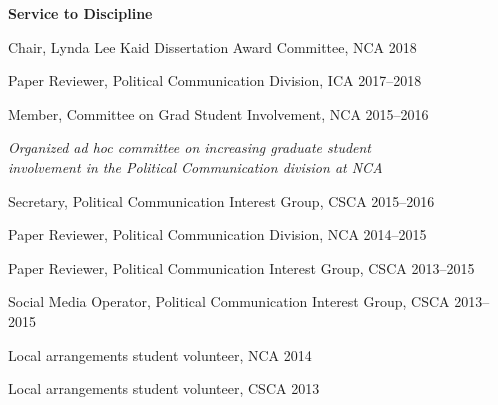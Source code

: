 \textbf{Service to Discipline}
  \begin{innerlist}
    \item Chair, Lynda Lee Kaid Dissertation Award Committee, NCA \hfill 2018
    \item Paper Reviewer, Political Communication Division, ICA \hfill 2017--2018
    \item Member, Committee on Grad Student Involvement, NCA \hfill 2015--2016
    \begin{outerlist}
      \item[]\textit{Organized ad hoc committee on increasing graduate student \\
        involvement in the Political Communication division at NCA}\bigskip
      \end{outerlist}
    \item Secretary, Political Communication Interest Group, CSCA \hfill 2015--2016
    \item Paper Reviewer, Political Communication Division, NCA \hfill 2014--2015
    \item Paper Reviewer, Political Communication Interest Group, CSCA \hfill 2013--2015
    \item Social Media Operator, Political Communication Interest Group, CSCA \hfill 2013--2015
    \item Local arrangements student volunteer, NCA \hfill 2014
    \item Local arrangements student volunteer, CSCA \hfill 2013
  \end{innerlist}
